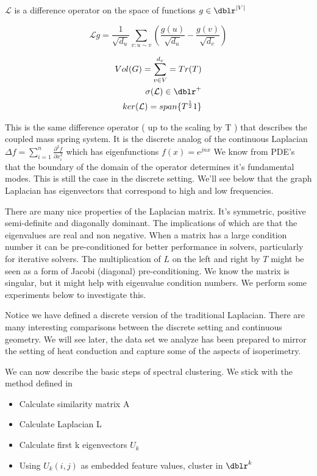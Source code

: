$\mathcal{L}$ is a difference operator on the space of functions $g \in \dblr^{|V|}$

\begin{equation*}
 \mathcal{L} g  = \frac{1}{\sqrt{d_u}} \sum\limits_{v : u \sim v} ( \frac{g(u)}{\sqrt{d_u}} -  \frac{g(v)}{\sqrt{d_v} } )
\end{equation*}

\begin{eqnarray}
Vol (G) = \sum\limits_{v \in V}^{d_v} = Tr(T) \\
\sigma(\mathcal{L}) \in \dblr^+ \\
ker ( \mathcal{L} ) = span\{ T^{\frac{1}{2}} 1 \}
\end{eqnarray}

This is the same difference operator ( up to the scaling by T ) that describes the coupled mass spring system.  It is the discrete analog of the continuous Laplacian $\Delta f=\sum_{i=1}^n \frac{\partial^2 f}{\partial x_i^2}$ which has eigenfunctions $f(x)=e^{j n x}$ We know from PDE's that the boundary of the domain of the operator determines it's fundamental modes.  This is still the case in the discrete setting. We'll see below that the graph Laplacian has eigenvectors that correspond to high and low frequencies. 

There are many nice properties of the Laplacian matrix. It's symmetric, positive semi-definite and diagonally dominant. The implications of which are that the eigenvalues are real and non negative. When a matrix has a large condition number it can be pre-conditioned for better performance in solvers, particularly for iterative solvers. The multiplication of $L$ on the left and right by $T$ might be seen as a form of Jacobi (diagonal) pre-conditioning. We know the matrix is singular, but it might help with eigenvalue condition numbers. We perform some experiments below to investigate this. 

Notice we have defined a discrete version of the traditional Laplacian.  There are many interesting comparisons between the discrete setting and continuous geometry. We will see later, the data set we analyze has been prepared to mirror the setting of heat conduction and capture some of the aspects of isoperimetry.

We can now describe the basic steps of spectral clustering.  We stick with the method defined in \cite{NIPS2001_801272ee}

\begin{itemize}
\setlength\itemsep{-0.5em}
    \item Calculate similarity matrix A
    \item Calculate Laplacian L
    \item Calculate first k eigenvectors $U_k$
    \item Using $U_k(i,j)$ as embedded feature values, cluster in $\dblr^k$
\end{itemize}

